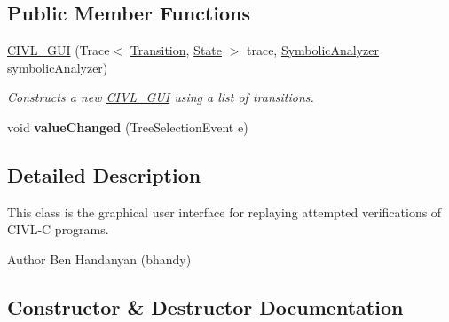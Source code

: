 \subsection*{Public Member Functions}
\begin{DoxyCompactItemize}
\item 
\hyperlink{classedu_1_1udel_1_1cis_1_1vsl_1_1civl_1_1gui_1_1IF_1_1CIVL__GUI_a8cad48e8c4336f6f3e4b5e6b2ddc9fb8}{C\+I\+V\+L\+\_\+\+G\+U\+I} (Trace$<$ \hyperlink{interfaceedu_1_1udel_1_1cis_1_1vsl_1_1civl_1_1semantics_1_1IF_1_1Transition}{Transition}, \hyperlink{interfaceedu_1_1udel_1_1cis_1_1vsl_1_1civl_1_1state_1_1IF_1_1State}{State} $>$ trace, \hyperlink{interfaceedu_1_1udel_1_1cis_1_1vsl_1_1civl_1_1semantics_1_1IF_1_1SymbolicAnalyzer}{Symbolic\+Analyzer} symbolic\+Analyzer)
\begin{DoxyCompactList}\small\item\em Constructs a new \hyperlink{classedu_1_1udel_1_1cis_1_1vsl_1_1civl_1_1gui_1_1IF_1_1CIVL__GUI}{C\+I\+V\+L\+\_\+\+G\+U\+I} using a list of transitions. \end{DoxyCompactList}\item 
\hypertarget{classedu_1_1udel_1_1cis_1_1vsl_1_1civl_1_1gui_1_1IF_1_1CIVL__GUI_a2c4b8b4b05cb2cd37ce81d416098dd03}{}void {\bfseries value\+Changed} (Tree\+Selection\+Event e)\label{classedu_1_1udel_1_1cis_1_1vsl_1_1civl_1_1gui_1_1IF_1_1CIVL__GUI_a2c4b8b4b05cb2cd37ce81d416098dd03}

\end{DoxyCompactItemize}


\subsection{Detailed Description}
This class is the graphical user interface for replaying attempted verifications of C\+I\+V\+L-\/\+C programs. 

\begin{DoxyAuthor}{Author}
Ben Handanyan (bhandy) 
\end{DoxyAuthor}


\subsection{Constructor \& Destructor Documentation}
\hypertarget{classedu_1_1udel_1_1cis_1_1vsl_1_1civl_1_1gui_1_1IF_1_1CIVL__GUI_a8cad48e8c4336f6f3e4b5e6b2ddc9fb8}{}
